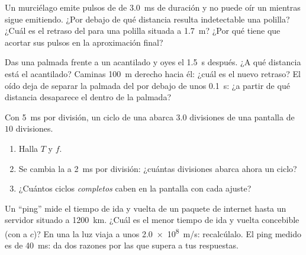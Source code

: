 \begin{exercise}[$\star\star\star$]\label{exo:g10:signals-and-waves:12}
Un murciélago emite pulsos de  de \qty{3.0}{ms} de duración
y no puede oír un  mientras sigue emitiendo. ¿Por debajo de qué
distancia resulta indetectable una polilla? ¿Cuál es el retraso del 
para una polilla situada a \qty{1.7}{m}? ¿Por qué tiene que acortar sus
pulsos en la aproximación final?
\end{exercise}

\begin{exercise}[$\star\star\star$]\label{exo:g10:signals-and-waves:13}
Das una palmada frente a un acantilado y oyes el  \qty{1.5}{s}
después. ¿A qué distancia está el acantilado? Caminas \qty{100}{m}
derecho hacia él: ¿cuál es el nuevo retraso? El oído deja de separar la
palmada del  por debajo de unos \qty{0.1}{s}: ¿a partir de qué
distancia desaparece el  dentro de la palmada?
\end{exercise}

\begin{exercise}[$\star\star\star$]\label{exo:g10:signals-and-waves:14}
Con \qty{5}{ms} por división, un ciclo de una  abarca $3.0$
divisiones de una pantalla de $10$ divisiones.
\begin{enumerate}
  \item Halla $T$ y $f$.
  \item Se cambia la  a \qty{2}{ms} por división:
        ¿cuántas divisiones abarca ahora un ciclo?
  \item ¿Cuántos ciclos \emph{completos} caben en la pantalla con cada
        ajuste?
\end{enumerate}
\end{exercise}

\begin{exercise}[$\star\star\star$]\label{exo:g10:signals-and-waves:15}
Un ``ping'' mide el tiempo de ida y vuelta de un paquete de internet
hasta un servidor situado a \qty{1200}{km}. ¿Cuál es el menor tiempo de
ida y vuelta concebible (con  a $c$)? En una  la luz
viaja a unos \qty{2.0e8}{m/s}: recalcúlalo. El ping medido es de
\qty{40}{ms}: da dos razones por las que supera a tus respuestas.
\end{exercise}

